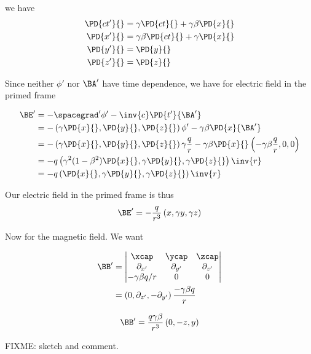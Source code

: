 we have
\begin{align}\label{eqn:relElectroDynProblemSet2:n}
\PD{c t'}{} &= \gamma \PD{ct}{} + \gamma \beta \PD{x}{} \\
\PD{x'}{} &= \gamma \beta \PD{ct}{} + \gamma \PD{x}{} \\
\PD{y'}{} &= \PD{y}{} \\
\PD{z'}{} &= \PD{z}{}
\end{align}

Since neither $\phi'$ nor $\BA'$ have time dependence, we have for electric field in the primed frame

\begin{align*}
\BE' 
&= -\spacegrad' \phi' - \inv{c} \PD{t'}{\BA'} \\
&= 
-\left( \gamma \PD{x}{}, \PD{y}{}, \PD{z}{} \right) \phi'
- \gamma \beta \PD{x}{\BA'} \\
&= 
-\left( \gamma \PD{x}{}, \PD{y}{}, \PD{z}{} \right) \gamma \frac{q}{r}
- \gamma \beta \PD{x}{} \left( -\gamma \beta \frac{q}{r}, 0, 0 \right) \\
&= -q \left( \gamma^2 ( 1 - \beta^2 ) \PD{x}{}, \gamma \PD{y}{}, \gamma \PD{z}{} \right) \inv{r} \\
&= -q \left( \PD{x}{}, \gamma \PD{y}{}, \gamma \PD{z}{} \right) \inv{r}
\end{align*}

Our electric field in the primed frame is thus
\begin{equation}\label{eqn:relElectroDynProblemSet2:n}
\BE' = -\frac{q}{r^3} \left( x, \gamma y, \gamma z \right) 
\end{equation}

Now for the magnetic field.  We want

\begin{align*}
\BB' 
&= 
\begin{vmatrix}
\xcap & \ycap & \zcap \\
\partial_{x'} & \partial_{y'} & \partial_{z'} \\
-\gamma \beta q/r & 0 & 0
\end{vmatrix} \\
&=
\left( 0, \partial_{z'}, -\partial_{y'} \right) \frac{-\gamma \beta q}{r} \\
\end{align*}

\begin{equation}\label{eqn:relElectroDynProblemSet2:n}
\BB'
=
\frac{q \gamma \beta}{r^3} \left( 0, -z, y \right)
\end{equation}

FIXME: sketch and comment.

\EndNoBibArticle
